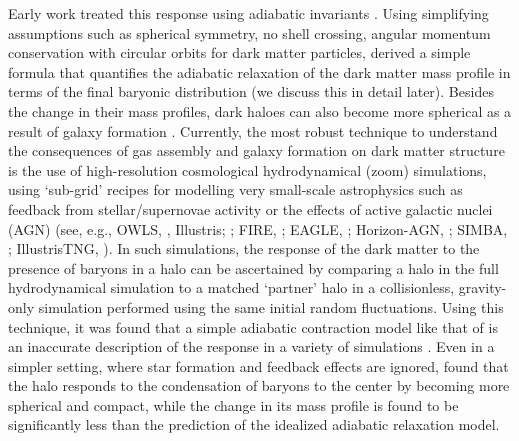 Early work treated this response using adiabatic invariants
\citep[][]{osti6457593,1984MNRAS.211..753B,1986ApJ...301...27B,1987ApJ...318...15R}. 
Using simplifying assumptions such as spherical symmetry, no shell crossing, angular momentum conservation with circular orbits for dark matter particles, \citet[][]{1986ApJ...301...27B} derived a simple formula that quantifies the adiabatic relaxation of the dark matter mass profile in terms of the final baryonic distribution (we discuss this in detail later). Besides the change in their mass profiles, dark haloes can also become more spherical as a result of galaxy formation \citep[][]{1994ApJ...431..617D}.
Currently, the most robust technique to understand the consequences of gas assembly and galaxy formation on dark matter structure is the use of high-resolution cosmological hydrodynamical (zoom) simulations, using `sub-grid' recipes for modelling very small-scale astrophysics such as feedback from stellar/supernovae activity or the effects of active galactic nuclei (AGN) (see, e.g., OWLS, \citealp{2010MNRAS.402.1536S}, Illustris; \citealp{2014MNRAS.445..175G}; FIRE, \citealp{2014MNRAS.445..581H}; EAGLE, \citealp{2015MNRAS.446..521S}; Horizon-AGN,
\citealp[][]{2017MNRAS.467.4739K}; SIMBA,
\citealp[][]{2019MNRAS.486.2827D}; IllustrisTNG, \citealp{2019ComAC...6....2N}). In such simulations, the response of the dark matter to the presence of baryons in a halo can be ascertained by comparing a halo in the full hydrodynamical simulation to a matched `partner' halo in a collisionless, gravity-only simulation performed using the same initial random fluctuations. 
Using this technique, it was found that a simple adiabatic contraction model like that of \citet[][]{1986ApJ...301...27B} is an inaccurate description of the response in a variety of simulations \citep[see, e.g.,][]{2004ApJ...616...16G,2006PhRvD..74l3522G,2010MNRAS.402..776P,2010MNRAS.406..922T,2010MNRAS.405.2161D,2010MNRAS.407..435A,2011MNRAS.414..195T,2016MNRAS.461.2658D,2019A&A...622A.197A,2022MNRAS.511.3910F}. Even in a simpler setting, where star formation and feedback effects are ignored, \citet{2010MNRAS.407..435A} found that the halo responds to the condensation of baryons to the center by becoming more spherical and compact, while the change in its mass profile is found to be significantly less than the prediction of the idealized adiabatic relaxation model.


